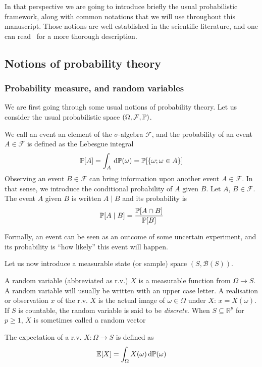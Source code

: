 \documentclass[../../Main_ManuscritThese.tex]{subfiles}
\begin{document}
In that perspective we are going to introduce briefly the usual probabilistic framework, along with common notations that we will use throughout this manuscript. Those notions are well established in the scientific literature, and one can read~\cite{billingsley_probability_2008} for a more thorough description.

\subsection{Notions of probability theory}
\subsubsection{Probability measure, and random variables}
\label{sec:notion_prob_theory}

We are first going through some usual notions of probability theory. 
Let us consider the usual probabilistic space $(\Omega, \mathcal{F}, \mathbb{P})$.
\begin{definition}
  \label{def:prob_event}
   We call an event an element of the $\sigma$-algebra $\mathcal{F}$, and the probability of an event $A\in \mathcal{F}$ is defined as the Lebesgue integral
  \begin{equation}
    \mathbb{P}[A] = \int_{A} \,\mathrm{d}\mathbb{P}(\omega) = \mathbb{P}[\{\omega ; \omega \in A\}]
  \end{equation}
Observing an event $B \in \mathcal{F}$ can bring information upon another event $A\in \mathcal{F}$. In that sense, we introduce the conditional probability of $A$ given $B$.
\label{def:cond_proba}
  Let $A$, $B \in \mathcal{F}$.
  The event $A$ given $B$ is written $A \mid B$ and its probability is
  \begin{equation}
    \mathbb{P}[A \mid B] = \frac{\mathbb{P}[A \cap B]}{\mathbb{P}[B]}
  \end{equation}
\end{definition}
Formally, an event can be seen as an outcome of some uncertain experiment, and its probability is ``how likely'' this event will happen.

Let us now introduce a measurable state (or sample) space $(S, \mathcal{B}(S))$.
\begin{definition}
  \label{def:random_variable}
  A random variable (abbreviated as r.v.) $X$ is a measurable function from $\Omega \longrightarrow S$. A random variable will usually be written with an upper case letter. A realisation or observation $x$ of the r.v. $X$ is the actual image of $\omega\in\Omega$ under $X$: $x = X(\omega)$. If $S$ is countable, the random variable is said to be \emph{discrete}. When $S\subseteq \mathbb{R}^p$ for $p\geq 1$, $X$ is sometimes called a random vector
  
  \label{def:expectation}
  The expectation of a r.v. $X:\Omega \rightarrow S$ is defined as
  \begin{equation}
    \mathbb{E}[X] = \int_{\Omega} X(\omega) \,\mathrm{d}\mathbb{P}(\omega)
  \end{equation}
\end{definition}
\end{document}
